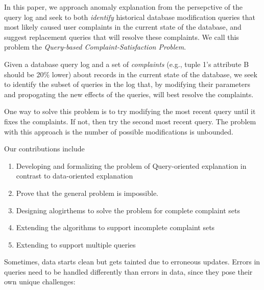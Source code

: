 In this paper, we approach anomaly explanation from the persepctive of the query log and seek to
both {\it identify}  historical database modification queries that most likely caused user complaints 
in the current state of the database, and suggest replacement queries that will resolve these complaints.
We call this problem the {\it Query-based Complaint-Satisfaction Problem}.

Given a database query log and a set of {\it complaints} (e.g., tuple 1's attribute B should be 20\% lower) about records in the current state of the database,
we seek to identify the subset of queries in the log that, by modifying their parameters and propogating the new effects of the queries, 
will best resolve the complaints.  

One way to solve this problem is to try modifying the most recent query until it fixes the complaints.  
If not, then try the second most recent query.  
The problem with this approach is the number of possible modifications is unbounded.

Our contributions include

\begin{enumerate}
\item Developing and formalizing the problem of Query-oriented explanation in contrast to data-oriented explanation
\item Prove that the general problem is impossible.
\item Designing alogirthems to solve the problem for complete complaint sets
\item Extending the algorithms to support incomplete complaint sets
\item Extending to support multiple queries
\end{enumerate}


Sometimes, data starts clean but gets tainted due to erroneous
updates. Errors in queries need to be handled differently than errors
in data, since they pose their own unique challenges:

